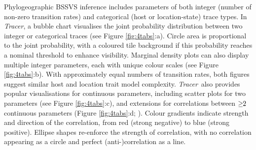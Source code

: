 \documentclass{bioinfo_tracer}
\newcommand{\tracer}{\emph{Tracer}}
\begin{document}
Phylogeographic BSSVS inference includes parameters of both integer (number of non-zero transition rates) and categorical (host or location-state) trace types.
In \tracer, a bubble chart visualises the joint probability distribution between two integer or categorical traces (see Figure \ref{fig:4tabs}:a).
Circle area is proportional to the joint probability, %
with a coloured tile background if this probability reaches a nominal threshold to enhance visibility.
Marginal density plots can also display multiple integer parameters, each with unique colour scales (see Figure \ref{fig:4tabs}:b).
With approximately equal numbers of transition rates, both figures suggest similar host and location trait model complexity.
\tracer\ also provides
 popular visualisations for continuous parameters, including scatter plots for two parameters (see Figure \ref{fig:4tabs}:c),
 and extensions for correlations between $\ge\hspace{-0.32em}2$ continuous parameters (Figure \ref{fig:4tabs}:d; \citet{Murdoch}).
Colour gradients indicate strength and direction of the correlation, from red (strong negative) to blue (strong positive).
Ellipse shapes re-enforce the strength of correlation, with no correlation appearing as a circle and perfect (anti-)correlation as a line.
\end{document}
